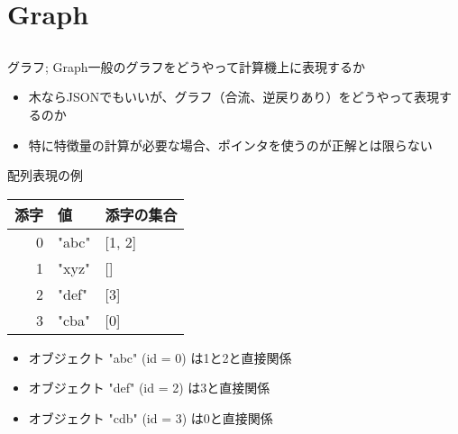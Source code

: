 \documentclass{beamer}
\begin{document}
\section{Graph}		%
\subsection{}

\begin{frame}[fragile]{グラフ; Graph}{一般のグラフをどうやって計算機上に表現するか}
\begin{itemize}%
\item 木ならJSONでもいいが、グラフ（合流、逆戻りあり）をどうやって表現するのか
\item 特に特徴量の計算が必要な場合、ポインタを使うのが正解とは限らない
\end{itemize}

配列表現の例
\begin{center}
\begin{tabular}{|r| l | l |}
\hline
添字 & 値 & 添字の集合 \\\hline
0 & "abc" & [1, 2] \\\hline
1 & "xyz" & [] \\\hline
2 & "def" & [3] \\\hline
3 & "cba" & [0] \\\hline
\end{tabular}
\end{center}

\begin{itemize}%
\item オブジェクト "abc" (id = 0) は1と2と直接関係
\item オブジェクト "def" (id = 2) は3と直接関係
\item オブジェクト "cdb" (id = 3) は0と直接関係
\end{itemize}
\end{frame}
\end{document}
